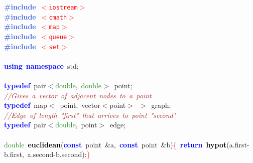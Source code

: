 \noindent
\mbox{}\textbf{\textcolor{RoyalBlue}{\#include}}\ \texttt{\textcolor{Red}{$<$iostream$>$}} \\
\mbox{}\textbf{\textcolor{RoyalBlue}{\#include}}\ \texttt{\textcolor{Red}{$<$cmath$>$}} \\
\mbox{}\textbf{\textcolor{RoyalBlue}{\#include}}\ \texttt{\textcolor{Red}{$<$map$>$}} \\
\mbox{}\textbf{\textcolor{RoyalBlue}{\#include}}\ \texttt{\textcolor{Red}{$<$queue$>$}} \\
\mbox{}\textbf{\textcolor{RoyalBlue}{\#include}}\ \texttt{\textcolor{Red}{$<$set$>$}} \\
\mbox{} \\
\mbox{}\textbf{\textcolor{Blue}{using}}\ \textbf{\textcolor{Blue}{namespace}}\ std\textcolor{BrickRed}{;} \\
\mbox{} \\
\mbox{}\textbf{\textcolor{Blue}{typedef}}\ pair\textcolor{BrickRed}{$<$}\textcolor{ForestGreen}{double}\textcolor{BrickRed}{,}\ \textcolor{ForestGreen}{double}\textcolor{BrickRed}{$>$}\ point\textcolor{BrickRed}{;} \\
\mbox{}\textit{\textcolor{Brown}{//Gives\ a\ vector\ of\ adjacent\ nodes\ to\ a\ point}} \\
\mbox{}\textbf{\textcolor{Blue}{typedef}}\ map\textcolor{BrickRed}{$<$}\ point\textcolor{BrickRed}{,}\ vector\textcolor{BrickRed}{$<$}point\textcolor{BrickRed}{$>$}\ \textcolor{BrickRed}{$>$}\ graph\textcolor{BrickRed}{;} \\
\mbox{}\textit{\textcolor{Brown}{//Edge\ of\ length\ "{}first"{}\ that\ arrives\ to\ point\ "{}second"{}}} \\
\mbox{}\textbf{\textcolor{Blue}{typedef}}\ pair\textcolor{BrickRed}{$<$}\textcolor{ForestGreen}{double}\textcolor{BrickRed}{,}\ point\textcolor{BrickRed}{$>$}\ edge\textcolor{BrickRed}{;}\  \\
\mbox{} \\
\mbox{}\textcolor{ForestGreen}{double}\ \textbf{\textcolor{Black}{euclidean}}\textcolor{BrickRed}{(}\textbf{\textcolor{Blue}{const}}\ point\ \textcolor{BrickRed}{\&}a\textcolor{BrickRed}{,}\ \textbf{\textcolor{Blue}{const}}\ point\ \textcolor{BrickRed}{\&}b\textcolor{BrickRed}{)}\textcolor{Red}{\{}\ \textbf{\textcolor{Blue}{return}}\ \textbf{\textcolor{Black}{hypot}}\textcolor{BrickRed}{(}a\textcolor{BrickRed}{.}first\textcolor{BrickRed}{-}b\textcolor{BrickRed}{.}first\textcolor{BrickRed}{,}\ a\textcolor{BrickRed}{.}second\textcolor{BrickRed}{-}b\textcolor{BrickRed}{.}second\textcolor{BrickRed}{);}\textcolor{Red}{\}} \\

